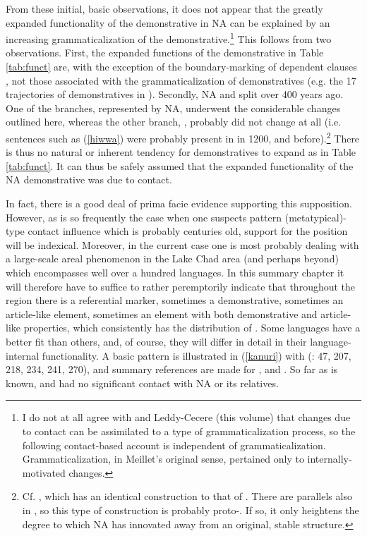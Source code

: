 \documentclass[output=paper]{langsci/langscibook}
\begin{document}
From these initial, basic observations, it does not appear that the greatly expanded functionality of the demonstrative in NA can be explained by an increasing {grammaticalization} of the demonstrative.\footnote{I do not at all agree with \citet{HeineKuteva2011} and Leddy-Cecere (this volume) that changes due to contact can be assimilated to a type of {grammaticalization} process, so the following contact-based account is independent of {grammaticalization}. Grammaticalization, in Meillet's original sense, pertained only to internally-motivated changes.} This follows from two observations. First, the expanded functions of the demonstrative in Table \ref{tab:funct} are, with the exception of the boundary-marking of dependent clauses , not those associated with the {grammaticalization} of {demonstratives} (e.g. the 17 trajectories of {demonstratives} in \citealt{Diessel1999}). Secondly, NA and  split over 400 years ago. One of the branches, represented by NA, underwent the considerable changes outlined here, whereas the other branch, , probably did not change at all (i.e. sentences such as (\ref{hiwwa}) were probably present in  in 1200, and before).\footnote{Cf. , which has an identical construction to that of . There are parallels also in  , so this type of construction is probably proto-. If so, it only heightens the degree to which NA has innovated away from an original, stable structure.} There is thus no natural or inherent tendency for {demonstratives} to expand as in Table \ref{tab:funct}. It can thus be safely assumed that the expanded functionality of the NA demonstrative was due to contact.

In fact, there is a good deal of prima facie evidence supporting this supposition. However, as is so frequently the case when one suspects pattern (metatypical)-type contact influence which is probably centuries old, support for the position will be indexical. Moreover, in the current case one is most probably dealing with a large-scale areal phenomenon in the {Lake Chad} area (and perhaps beyond) which encompasses well over a hundred languages. In this summary chapter it will therefore have to suffice to rather peremptorily indicate that throughout the region there is a referential marker, sometimes a demonstrative, sometimes an article-like element, sometimes an element with both demonstrative and article-like properties, which consistently has the distribution of . Some languages have a better fit than others, and, of course, they will differ in detail in their language-internal functionality. A basic pattern is illustrated in (\ref{kanuri}) with  (\citealt{Hutchison1981}: 47, 207, 218, 234, 241, 270), and summary references are made for ,  and . So far as is known,  and  had no significant contact with NA or its  relatives.
\end{document}
